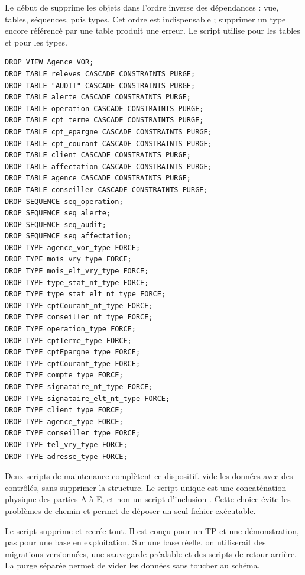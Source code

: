 Le début de  supprime les objets dans l'ordre
inverse des dépendances : vue, tables, séquences, puis types. Cet ordre est
indispensable ; supprimer un type encore référencé par une table produit une
erreur. Le script utilise  pour les tables et
 pour les types.

\begin{lstlisting}[caption={Nettoyage initial du schéma.},label={lst:purge-schema},basicstyle=\ttfamily\scriptsize]
DROP VIEW Agence_VOR;
DROP TABLE releves CASCADE CONSTRAINTS PURGE;
DROP TABLE "AUDIT" CASCADE CONSTRAINTS PURGE;
DROP TABLE alerte CASCADE CONSTRAINTS PURGE;
DROP TABLE operation CASCADE CONSTRAINTS PURGE;
DROP TABLE cpt_terme CASCADE CONSTRAINTS PURGE;
DROP TABLE cpt_epargne CASCADE CONSTRAINTS PURGE;
DROP TABLE cpt_courant CASCADE CONSTRAINTS PURGE;
DROP TABLE client CASCADE CONSTRAINTS PURGE;
DROP TABLE affectation CASCADE CONSTRAINTS PURGE;
DROP TABLE agence CASCADE CONSTRAINTS PURGE;
DROP TABLE conseiller CASCADE CONSTRAINTS PURGE;
DROP SEQUENCE seq_operation;
DROP SEQUENCE seq_alerte;
DROP SEQUENCE seq_audit;
DROP SEQUENCE seq_affectation;
DROP TYPE agence_vor_type FORCE;
DROP TYPE mois_vry_type FORCE;
DROP TYPE mois_elt_vry_type FORCE;
DROP TYPE type_stat_nt_type FORCE;
DROP TYPE type_stat_elt_nt_type FORCE;
DROP TYPE cptCourant_nt_type FORCE;
DROP TYPE conseiller_nt_type FORCE;
DROP TYPE operation_type FORCE;
DROP TYPE cptTerme_type FORCE;
DROP TYPE cptEpargne_type FORCE;
DROP TYPE cptCourant_type FORCE;
DROP TYPE compte_type FORCE;
DROP TYPE signataire_nt_type FORCE;
DROP TYPE signataire_elt_nt_type FORCE;
DROP TYPE client_type FORCE;
DROP TYPE agence_type FORCE;
DROP TYPE conseiller_type FORCE;
DROP TYPE tel_vry_type FORCE;
DROP TYPE adresse_type FORCE;
\end{lstlisting}

Deux scripts de maintenance complètent ce dispositif.
 vide les données avec des  contrôlés,
sans supprimer la structure. Le script unique
 est une concaténation physique des parties A à
E, et non un script d'inclusion . Cette choice évite les problèmes de
chemin et permet de déposer un seul fichier exécutable.

\begin{attentionbox}
Le script supprime et recrée tout. Il est conçu pour un TP et une démonstration,
pas pour une base en exploitation. Sur une base réelle, on utiliserait des
migrations versionnées, une sauvegarde préalable et des scripts de retour
arrière. La purge séparée permet de vider les données sans toucher au schéma.
\end{attentionbox}

